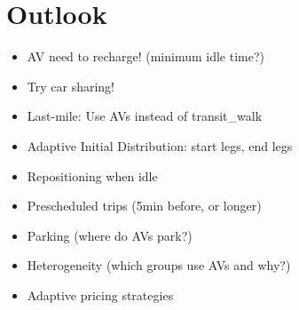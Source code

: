 \section{Outlook}

\begin{itemize}
\item AV need to recharge! \citep{Chen2015} (minimum idle time?)
\item Try car sharing!
\item Last-mile: Use AVs instead of transit\_walk
\item Adaptive Initial Distribution: start legs, end legs
\item Repositioning when idle
\item Prescheduled trips (5min before, or longer)
\item Parking (where do AVs park?)
\item Heterogeneity (which groups use AVs and why?)
\item Adaptive pricing strategies \citep{Chen16}
\end{itemize}
